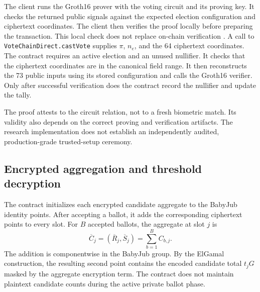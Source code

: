 The client runs the Groth16 prover with the voting circuit and its proving
key. It checks the returned public signals against the expected election
configuration and ciphertext coordinates. The client then verifies the
proof locally before preparing the transaction. This local check does not
replace on-chain verification \citep{groth2016snark}.
A call to \texttt{VoteChainDirect.castVote} supplies $\pi$, $n_e$, and the
64 ciphertext coordinates. The contract requires an active election and
an unused nullifier. It checks that the ciphertext coordinates are in the
canonical field range. It then reconstructs the 73 public inputs using its
stored configuration and calls the Groth16 verifier. Only after successful
verification does the contract record the nullifier and update the tally.

The proof attests to the circuit relation, not to a fresh biometric match.
Its validity also depends on the correct proving and verification artifacts.
The research implementation does not establish an independently audited,
production-grade trusted-setup ceremony.


\subsection{Encrypted aggregation and threshold decryption}
\label{subsec:protocol-threshold}

The contract initializes each encrypted candidate aggregate to the BabyJub
identity points. After accepting a ballot, it adds the corresponding
ciphertext points to every slot. For $B$ accepted ballots, the aggregate at
slot $j$ is
\begin{equation}
\label{eq:protocol-aggregation}
\overline{C}_j=(\overline{R}_j,\overline{S}_j)
 =\sum_{b=1}^{B}C_{b,j}.
\end{equation}
The addition is componentwise in the BabyJub group. By the ElGamal
construction, the resulting second point contains the encoded candidate
total $t_jG$ masked by the aggregate encryption term. The contract does
not maintain plaintext candidate counts during the active private ballot
phase.

